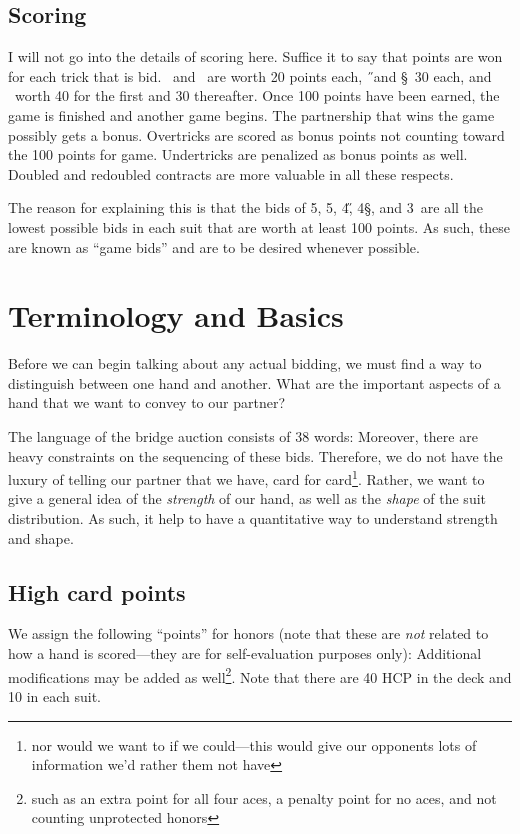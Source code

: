 \documentclass[oneside]{memoir}
\begin{document}
\subsection{Scoring}
I will not go into the details of scoring here.  Suffice it to say
that points are won for each trick that is bid.  \C\ and \D\ are worth
20 points each, \H\ and \S\ 30 each, and \NT\ worth 40 for the first and
30 thereafter.  Once 100 points have been earned, the game is finished
and another game begins.  The partnership that wins the game possibly
gets a bonus.  Overtricks are scored as bonus points not counting
toward the 100 points for game.  Undertricks are penalized as bonus
points as well.  Doubled and redoubled contracts are more valuable in
all these respects.

The reason for explaining this is that the bids of 5\C, 5\D, 4\H, 4\S,
and 3\NT\ are all the lowest possible bids in each suit that are worth at
least 100 points.  As such, these are known as ``game bids'' and are to
be desired whenever possible.

\section{Terminology and Basics}
Before we can begin talking about any actual bidding, we must find a way
to distinguish between one hand and another.  What are the important aspects
of a hand that we want to convey to our partner?

The language of the bridge auction consists of 38 words:
Moreover, there are heavy constraints on the sequencing of these bids.
Therefore, we do not have the luxury of telling our partner that we
have, card for card\footnote{nor would we want to if we could---this
  would give our opponents lots of information we'd rather them not
  have}.  Rather, we want to give a general idea of the
\textit{strength} of our hand, as well as the \textit{shape} of the
suit distribution.
As such, it help to have a quantitative way to understand strength and
shape.

\subsection{High card points}
We assign the following ``points'' for honors (note that these are \textit{not}
related to how a hand is scored---they are for self-evaluation purposes only):
Additional modifications may be added as well\footnote{such as an
  extra point for all four aces, a penalty point for no aces, and not
  counting unprotected honors}.  Note that there are 40 HCP in the
deck and 10 in each suit.  
\end{document}
